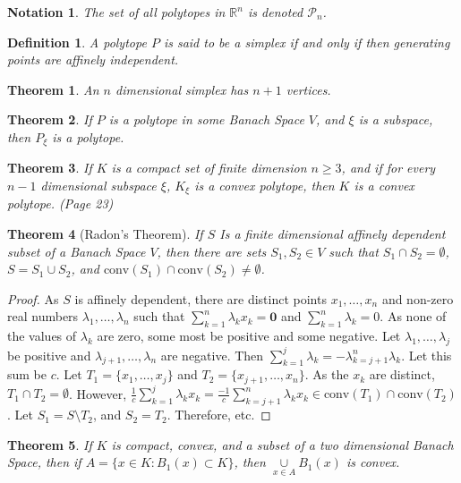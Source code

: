 \documentclass[12pt,oneside]{book}
\theoremstyle{mystyle}
\newtheorem{theorem}{Theorem}[section]
\newtheorem{definition}{Definition}[section]
\newtheorem{notation}{Notation}[section]
\begin{document}
\begin{notation}
The set of all polytopes in $\mathbb{R}^n$ is denoted $\mathscr{P}_n$.
\end{notation} 

\begin{definition}
A polytope $P$ is said to be a simplex if and only if then generating points are affinely independent.
\end{definition}

\begin{theorem}
An $n$ dimensional simplex has $n+1$ vertices.
\end{theorem}

\begin{theorem}
If $P$ is a polytope in some Banach Space $V$, and $\xi$ is a subspace, then $P_{\xi}$ is a polytope.
\end{theorem}

\begin{theorem}
If $K$ is a compact set of finite dimension $n\geq 3$, and if for every $n-1$ dimensional subspace $\xi$, $K_{\xi}$ is a convex polytope, then $K$ is a convex polytope. (Page 23)
\end{theorem}

\begin{theorem}[Radon's Theorem]
If $S$ Is a finite dimensional affinely dependent subset of a Banach Space $V$, then there are sets $S_1,S_2\in V$ such that $S_1\cap S_2 = \emptyset$, $S=S_1\cup S_2$, and $\textrm{conv}(S_1)\cap \textrm{conv}(S_2) \ne \emptyset$.
\end{theorem}
\begin{proof}
As $S$ is affinely dependent, there are distinct points $x_1,\hdots,x_n$ and non-zero real numbers $\lambda_1,\hdots,\lambda_n$ such that $\sum_{k=1}^{n}\lambda_k x_k= \mathbf{0}$ and $\sum_{k=1}^{n}\lambda_k = 0$. As none of the values of $\lambda_k$ are zero, some most be positive and some negative. Let $\lambda_1,\hdots, \lambda_j$ be positive and $\lambda_{j+1},\hdots, \lambda_n$ are negative. Then $\sum_{k=1}^{j} \lambda_k = - \lambda_{k=j+1}^{n}\lambda_k$. Let this sum be $c$. Let $T_1 = \{x_1,\hdots, x_j\}$ and $T_2=\{x_{j+1},\hdots, x_{n}\}$. As the $x_k$ are distinct, $T_1\cap T_2 = \emptyset$. However, $\frac{1}{c}\sum_{k=1}^{j}\lambda_k x_k = \frac{-1}{c}\sum_{k=j+1}^{n} \lambda_k x_k \in\textrm{conv}(T_1)\cap \textrm{conv}(T_2)$. Let $S_1 = S\setminus T_2$, and $S_2 = T_2$. Therefore, etc.
\end{proof}

\begin{theorem}
If $K$ is compact, convex, and a subset of a two dimensional Banach Space, then if $A = \{x\in K:B_{1}(x)\subset K\}$, then $\underset{x\in A}\cup B_{1}(x)$ is convex.
\end{theorem}
\end{document}

